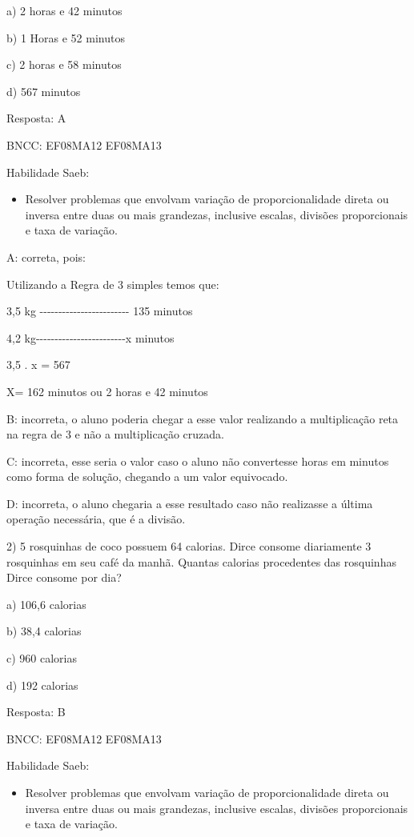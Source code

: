 {a) 2 horas e 42 minutos

b) 1 Horas e 52 minutos

c) 2 horas e 58 minutos

d) 567 minutos

Resposta: A

BNCC: EF08MA12 EF08MA13

Habilidade Saeb:

\begin{itemize}
\tightlist
\item
  Resolver problemas que envolvam variação de proporcionalidade direta
  ou inversa entre duas ou mais grandezas, inclusive escalas, divisões
  proporcionais e taxa de variação.
\end{itemize}

A: correta, pois:

Utilizando a Regra de 3 simples temos que:

3,5 kg
-\/-\/-\/-\/-\/-\/-\/-\/-\/-\/-\/-\/-\/-\/-\/-\/-\/-\/-\/-\/-\/-\/-\/-
135 minutos

4,2
kg-\/-\/-\/-\/-\/-\/-\/-\/-\/-\/-\/-\/-\/-\/-\/-\/-\/-\/-\/-\/-\/-\/-\/-x
minutos

3,5 . x = 567

X= 162 minutos ou 2 horas e 42 minutos

B: incorreta, o aluno poderia chegar a esse valor realizando a
multiplicação reta na regra de 3 e não a multiplicação cruzada.

C: incorreta, esse seria o valor caso o aluno não convertesse horas em
minutos como forma de solução, chegando a um valor equivocado.

D: incorreta, o aluno chegaria a esse resultado caso não realizasse a
última operação necessária, que é a divisão.

2) 5 rosquinhas de coco possuem 64 calorias. Dirce consome diariamente 3
rosquinhas em seu café da manhã. Quantas calorias procedentes das
rosquinhas Dirce consome por dia?

a) 106,6 calorias

b) 38,4 calorias

c) 960 calorias

d) 192 calorias

Resposta: B

BNCC: EF08MA12 EF08MA13

Habilidade Saeb:

\begin{itemize}
\tightlist
\item
  Resolver problemas que envolvam variação de proporcionalidade direta
  ou inversa entre duas ou mais grandezas, inclusive escalas, divisões
  proporcionais e taxa de variação.
\end{itemize}

}
